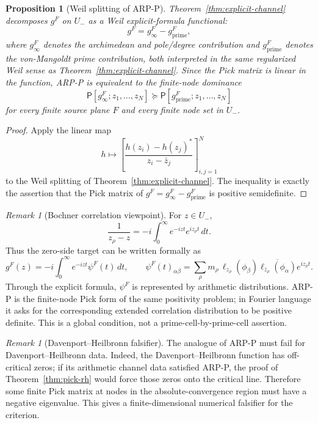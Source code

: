 \documentclass[11pt]{amsart}
\newtheorem{proposition}[theorem]{Proposition}
\theoremstyle{definition}
\theoremstyle{remark}
\newtheorem{remark}[theorem]{Remark}
\theoremstyle{definition}
\begin{document}
\begin{proposition}[Weil splitting of ARP-P]\label{prop:target-ineq}
Theorem~\ref{thm:explicit-channel} decomposes $g^F$ on $U_-$ as a Weil explicit-formula functional:
\[
   g^F=g_\infty^F-g_{\mathrm{prime}}^F,
\]
where $g_\infty^F$ denotes the archimedean and pole/degree contribution and
$g_{\mathrm{prime}}^F$ denotes the von-Mangoldt prime contribution, both interpreted in the same
regularized Weil sense as Theorem~\ref{thm:explicit-channel}.  Since the Pick matrix is linear in the
function, ARP-P is equivalent to the finite-node dominance
\[
   \mathsf P[g_\infty^F;z_1,\ldots,z_N]
   \succeq
   \mathsf P[g_{\mathrm{prime}}^F;z_1,\ldots,z_N]
\]
for every finite source plane $F$ and every finite node set in $U_-$.
\end{proposition}

\begin{proof}
Apply the linear map
\[
   h\longmapsto
   \left[
      \frac{h(z_i)-h(z_j)^*}{z_i-\bar z_j}
   \right]_{i,j=1}^{N}
\]
to the Weil splitting of Theorem~\ref{thm:explicit-channel}.  The inequality is exactly the assertion
that the Pick matrix of $g^F=g_\infty^F-g_{\mathrm{prime}}^F$ is positive semidefinite.
\end{proof}

\begin{remark}[Bochner correlation viewpoint]\label{rmk:bochner}
For $z\in U_-$,
\[
   \frac1{z_\rho-z}=-i\int_0^\infty e^{-izt}e^{iz_\rho t}\,dt.
\]
Thus the zero-side target can be written formally as
\[
   g^F(z)=-i\int_0^\infty e^{-izt}\psi^F(t)\,dt,
   \qquad
   \psi^F(t)_{\alpha\beta}
   =
   \sum_\rho
   m_\rho\,\ell_{z_\rho}(\phi_\beta)
   \overline{\ell_{\bar z_\rho}(\phi_\alpha)}
   e^{iz_\rho t}.
\]
Through the explicit formula, $\psi^F$ is represented by arithmetic distributions.  ARP-P is the
finite-node Pick form of the same positivity problem; in Fourier language it asks for the corresponding
extended correlation distribution to be positive definite.  This is a global condition, not a
prime-cell-by-prime-cell assertion.
\end{remark}

\begin{remark}[Davenport--Heilbronn falsifier]\label{rmk:dh-pick}
The analogue of ARP-P must fail for Davenport--Heilbronn data.  Indeed, the Davenport--Heilbronn function
has off-critical zeros; if its arithmetic channel data satisfied ARP-P, the proof of
Theorem~\ref{thm:pick-rh} would force those zeros onto the critical line.  Therefore some finite Pick
matrix at nodes in the absolute-convergence region must have a negative eigenvalue.  This gives a
finite-dimensional numerical falsifier for the criterion.
\end{remark}
\end{document}
